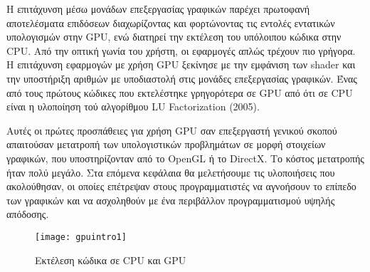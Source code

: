 Η επιτάχυνση μέσω μονάδων επεξεργασίας γραφικών παρέχει πρωτοφανή αποτελέσματα επιδόσεων διαχωρίζοντας και φορτώνοντας τις εντολές εντατικών υπολογισμών στην GPU, ενώ διατηρεί την εκτέλεση του υπόλοιπου κώδικα στην CPU. Από την οπτική γωνία του χρήστη, οι εφαρμογές απλώς τρέχουν πιο γρήγορα. H επιτάχυνση εφαρμογών με χρήση GPU ξεκίνησε με την εμφάνιση των shader και την υποστήριξη αριθμών με υποδιαστολή στις μονάδες επεξεργασίας γραφικών. Ένας από τους πρώτους κώδικες που εκτελέστηκε γρηγορότερα σε GPU από ότι σε CPU είναι η υλοποίηση τού αλγορίθμου LU Factorization (2005).

Αυτές οι πρώτες προσπάθειες για χρήση GPU σαν επεξεργαστή γενικού σκοπού απαιτούσαν μετατροπή των υπολογιστικών προβλημάτων σε μορφή στοιχείων γραφικών, που υποστηρίζονταν από το OpenGL ή το DirectX. Το κόστος μετατροπής ήταν πολύ μεγάλο. Στα επόμενα κεφάλαια θα μελετήσουμε τις υλοποιήσεις που ακολούθησαν, οι οποίες επέτρεψαν στους προγραμματιστές να αγνοήσουν το επίπεδο των γραφικών και να ασχοληθούν με ένα περιβάλλον προγραμματισμού υψηλής απόδοσης.

\begin{figure}[h]
\centering
\texttt{[image: gpuintro1]}
\caption{Εκτέλεση κώδικα σε CPU και GPU}
\end{figure}